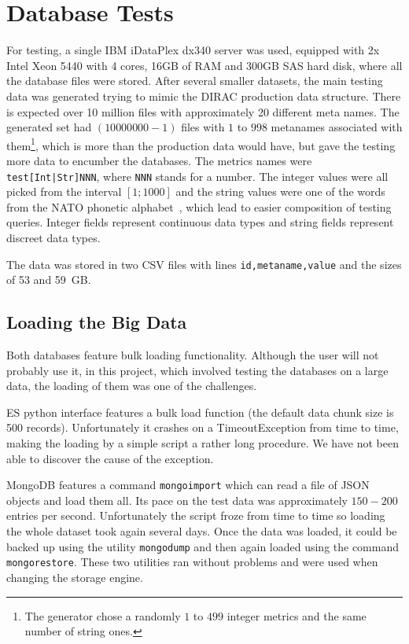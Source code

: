 
\section{Database Tests}

For testing, a single IBM iDataPlex dx340 server was used, equipped with 2x Intel Xeon 5440 with 4 cores, 16GB
of RAM and 300GB SAS hard disk, where all the database files were stored. After several smaller datasets, 
the main testing data was generated trying to mimic the DIRAC production data structure. There is expected 
over 10 million files with approximately 20 different meta names.
The generated set had $(10 000 000 - 1)$ files with $1$ to $998$ metanames associated with them\footnote{ 
The generator chose a randomly $1$ to $499$ integer metrics and the same number of string ones.}, which is more
than the production data would have, but gave the testing more data to encumber the databases.
The metrics names were \texttt{test[Int|Str]NNN}, where \texttt{NNN} stands for a number. The
integer values were all picked from the interval $[1;1000]$ and the string values were one of the
words from the NATO phonetic alphabet~\cite{NATO}, which lead to easier composition of testing queries. 
Integer fields represent continuous data types and string fields represent discreet data types.

The data was stored in two CSV files with lines \texttt{id,metaname,value} and the sizes of 53 and 59~GB.

\subsection{Loading the Big Data}

Both databases feature bulk loading functionality. Although the user will not probably use it, in
this project, which involved testing the databases on a large data, the loading of them was one 
of the challenges.

ES python interface features a bulk load function (the default data chunk size is 500 records). 
Unfortunately it crashes on a TimeoutException from time to time, making the loading by a simple script a rather long 
procedure. We have not been able to discover the cause of the exception.

MongoDB features a command \texttt{mongoimport} which can read a file of JSON objects and load
them all. Its pace on the test data was approximately $150-200$ entries per second. Unfortunately 
the script froze from time to time so loading the whole dataset took again several days. Once the data was
loaded, it could be backed up using the utility \texttt{mongodump} and then again loaded using the 
command \texttt{mongorestore}. These two utilities ran without problems and were used when changing the 
storage engine.

